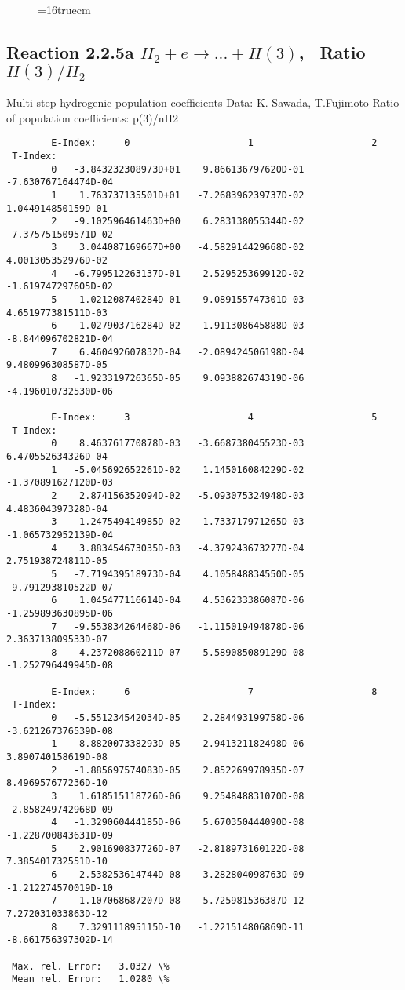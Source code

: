 \documentclass[12pt,dvipdfmx]{article}
\begin{document}
\begin{figure} \label{2.3.6lr1}
\epsfxsize=16truecm
\end{figure}
\newpage

\subsection{
Reaction 2.2.5a $ H_2 + e \rightarrow ...+ H(3) $, \    Ratio $H(3)/H_2 $
}
 Multi-step hydrogenic population coefficients
 Data: K. Sawada, T.Fujimoto \cite{kn:Sawada}
 Ratio of population coefficients: p(3)/nH2


\begin{small}\begin{verbatim}
        E-Index:     0                     1                     2
 T-Index:
        0   -3.843232308973D+01    9.866136797620D-01   -7.630767164474D-04
        1    1.763737135501D+01   -7.268396239737D-02    1.044914850159D-01
        2   -9.102596461463D+00    6.283138055344D-02   -7.375751509571D-02
        3    3.044087169667D+00   -4.582914429668D-02    4.001305352976D-02
        4   -6.799512263137D-01    2.529525369912D-02   -1.619747297605D-02
        5    1.021208740284D-01   -9.089155747301D-03    4.651977381511D-03
        6   -1.027903716284D-02    1.911308645888D-03   -8.844096702821D-04
        7    6.460492607832D-04   -2.089424506198D-04    9.480996308587D-05
        8   -1.923319726365D-05    9.093882674319D-06   -4.196010732530D-06

        E-Index:     3                     4                     5
 T-Index:
        0    8.463761770878D-03   -3.668738045523D-03    6.470552634326D-04
        1   -5.045692652261D-02    1.145016084229D-02   -1.370891627120D-03
        2    2.874156352094D-02   -5.093075324948D-03    4.483604397328D-04
        3   -1.247549414985D-02    1.733717971265D-03   -1.065732952139D-04
        4    3.883454673035D-03   -4.379243673277D-04    2.751938724811D-05
        5   -7.719439518973D-04    4.105848834550D-05   -9.791293810522D-07
        6    1.045477116614D-04    4.536233386087D-06   -1.259893630895D-06
        7   -9.553834264468D-06   -1.115019494878D-06    2.363713809533D-07
        8    4.237208860211D-07    5.589085089129D-08   -1.252796449945D-08

        E-Index:     6                     7                     8
 T-Index:
        0   -5.551234542034D-05    2.284493199758D-06   -3.621267376539D-08
        1    8.882007338293D-05   -2.941321182498D-06    3.890740158619D-08
        2   -1.885697574083D-05    2.852269978935D-07    8.496957677236D-10
        3    1.618515118726D-06    9.254848831070D-08   -2.858249742968D-09
        4   -1.329060444185D-06    5.670350444090D-08   -1.228700843631D-09
        5    2.901690837726D-07   -2.818973160122D-08    7.385401732551D-10
        6    2.538253614744D-08    3.282804098763D-09   -1.212274570019D-10
        7   -1.107068687207D-08   -5.725981536387D-12    7.272031033863D-12
        8    7.329111895115D-10   -1.221514806869D-11   -8.661756397302D-14

 Max. rel. Error:   3.0327 \%
 Mean rel. Error:   1.0280 \%

\end{verbatim}\end{small}
\end{document}
